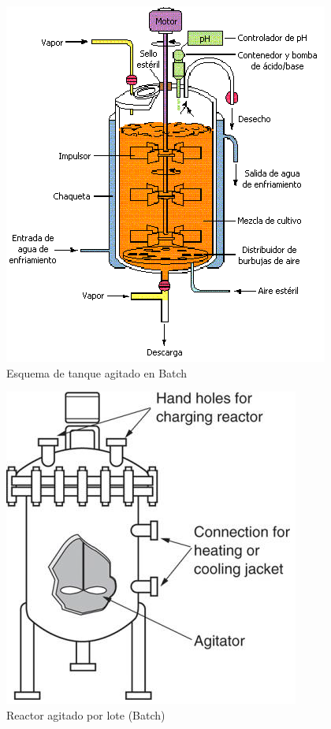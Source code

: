\begin{multicols}{2}
    \begin{figure}
        \centering
        \includegraphics[width=\textwidth]{img/esquemas/reactor_batch.png}
        \caption{Esquema de tanque agitado en Batch}
        \label{fig:reactor_batch}
    \end{figure}

    \begin{figure}
        \centering
        \includegraphics[width=\textwidth]{img/esquemas/reactor_agitado_batch.png}
        \caption{Reactor agitado por lote (Batch)}
        \label{fig:reactor_agitado_batch}
    \end{figure}
    

\end{multicols}
